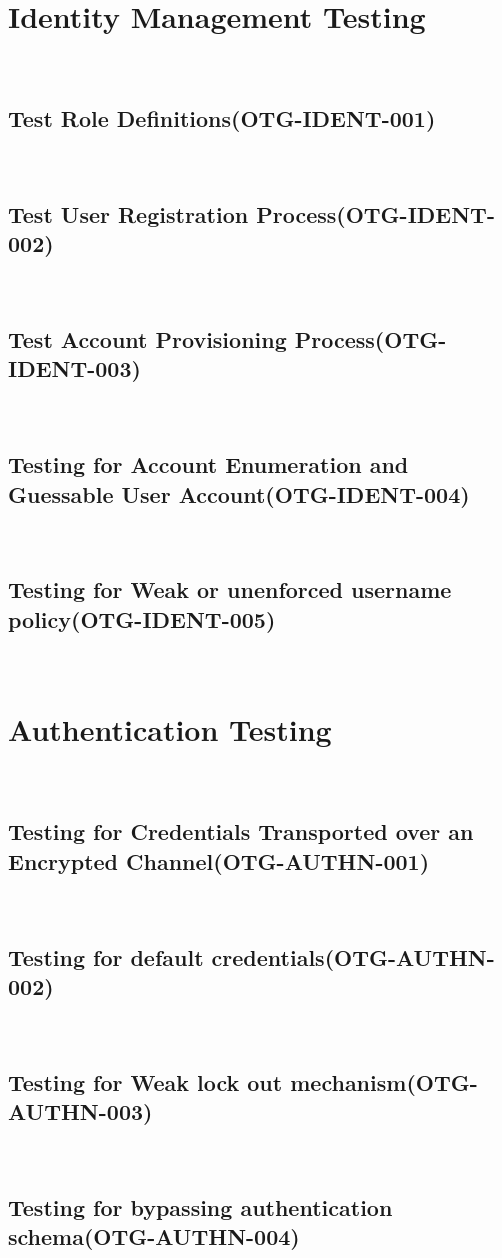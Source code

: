 \documentclass[headsepline,footsepline,footinclude=false,oneside,fontsize=11pt,paper=a4,listof=totoc,bibliography=totoc]{scrbook} %
\begin{document}
 
\pagebreak 
\section{Identity Management Testing}\
\subsection{Test Role Definitions(OTG-IDENT-001)}\
\pagebreak 
\subsection{Test User Registration Process(OTG-IDENT-002)}\
\pagebreak 
\subsection{Test Account Provisioning Process(OTG-IDENT-003)}\
\pagebreak 
\subsection{Testing for Account Enumeration and Guessable User Account(OTG-IDENT-004)}\
\pagebreak 
\subsection{Testing for Weak or unenforced username policy(OTG-IDENT-005)}\
 
\pagebreak 
\section{Authentication Testing}\
\subsection{Testing for Credentials Transported over an Encrypted Channel(OTG-AUTHN-001)}\
\pagebreak 
\subsection{Testing for default credentials(OTG-AUTHN-002)}\
\pagebreak 
\subsection{Testing for Weak lock out mechanism(OTG-AUTHN-003)}\
\pagebreak 
\subsection{Testing for bypassing authentication schema(OTG-AUTHN-004)}\
\pagebreak 
\end{document}

